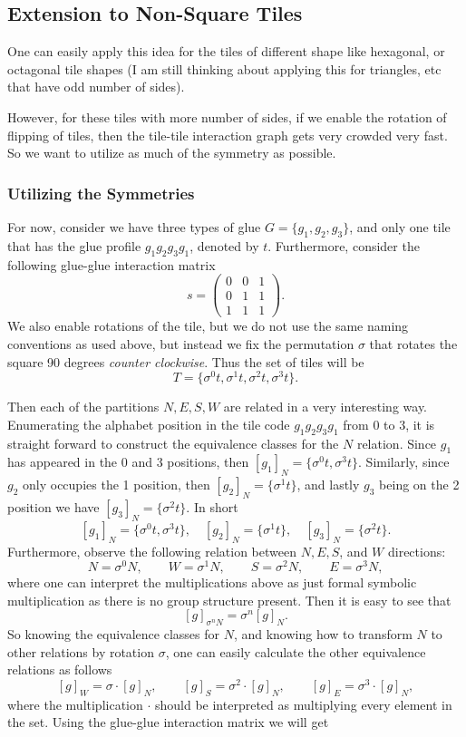 \documentclass[11pt,a4paper]{article}
\theoremstyle{definition}
\theoremstyle{remark}
\theoremstyle{definition}
\begin{document}
	
	
	\subsection{Extension to Non-Square Tiles}
	One can easily apply this idea for the tiles of different shape like hexagonal, or octagonal tile shapes (I am still thinking about applying this for triangles, etc that have odd number of sides). 
	
	However, for these tiles with more number of sides, if we enable the rotation of flipping of tiles, then the tile-tile interaction graph gets very crowded very fast. So we want to utilize as much of the symmetry as possible.
	
	
	\subsubsection{Utilizing the Symmetries}
	
	For now, consider we have three types of glue $ G = \{g_1,g_2,g_3\} $, and only one tile  that has the glue profile $  g_1g_2g_3g_1  $, denoted by $ t $. Furthermore, consider the following glue-glue interaction matrix
	\[ s = \begin{pmatrix}
		0 & 0 & 1 \\
		0 & 1 & 1 \\
		1 & 1 & 1 
	\end{pmatrix}. \]
	 We also enable rotations of the tile, but we do not use the same naming conventions as used above, but instead we fix the permutation $ \sigma $ that rotates the square 90 degrees \textit{counter clockwise}. Thus the set of tiles will be
	\[ T = \{ \sigma^0 t, \sigma^1 t, \sigma^2 t, \sigma^3 t \}. \]
	
	Then each of the partitions $ N,E,S,W $ are related in a very interesting way. Enumerating the alphabet position in the tile code $ g_1g_2g_3g_1 $ from $ 0 $ to $ 3 $, it is straight forward to construct the equivalence classes for the $ N $ relation. Since $ g_1 $ has appeared in the 0 and 3 positions, then $ [g_1]_N = \{\sigma^0t, \sigma^3t\} $. Similarly, since $ g_2 $ only occupies the 1 position, then $ [g_2]_N =\{ \sigma^1 t\} $, and lastly $ g_3 $ being on the 2 position we have $ [g_3]_N = \{\sigma^2 t\} $. In short
	\[ [g_1]_N = \{ \sigma^0 t, \sigma^3 t \},\quad [g_2]_N = \{\sigma^1t\}, \quad [g_3]_N = \{ \sigma^2t \}. \]
	Furthermore, observe the following relation between $ N,E,S $, and $ W $ directions:
	\[ N = \sigma^0 N, \qquad W = \sigma^1 N, \qquad S = \sigma^2 N, \qquad E = \sigma^3 N, \]
	where one can interpret the multiplications above as just formal symbolic multiplication as there is no group structure present. Then it is easy to see that
	\[ [g]_{\sigma^n N} = \sigma^n [g]_{N}. \]
	So knowing the equivalence classes for $ N $, and knowing how to transform $ N $ to other relations by rotation $ \sigma $, one can easily calculate the other equivalence relations as follows
	\[ [g]_W = \sigma\cdot [g]_N, \qquad [g]_S = \sigma^2\cdot [g]_N, \qquad [g]_E = \sigma^3\cdot [g]_N, \]
	where the multiplication $ \cdot $ should be interpreted as multiplying every element in the set. Using the glue-glue interaction matrix we will get
	
 	\FloatBarrier
 	
\end{document}
